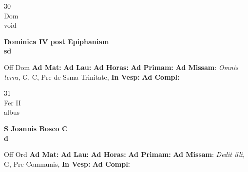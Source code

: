\documentclass[10pt, openany]{book}
\begin{document}
    \begin{center}
        \begin{minipage}{3.5in}
            \vspace{2em}
            \begin{minipage}{0.5in}
                {\Huge 30} \\
                {\normalsize Dom} \\
                {\normalsize void}
            \end{minipage}
            \begin{minipage}{3.0in}
                \textbf{ \large Dominica IV post Epiphaniam \\
                \textnormal{\normalsize sd}} \\ 
            \end{minipage}
            \begin{justify}Off Dom
                \textbf{Ad Mat: }
                \textbf{Ad Lau: }
                \textbf{Ad Horas: }
                \textbf{Ad Primam: }\textbf{Ad Missam}: \textit{Omnis terra,} G, C, Pre de Ssma Trinitate,  
                \textbf{In Vesp: }
                \textbf{Ad Compl: }
            \end{justify}
        \end{minipage}
    \end{center}

    \begin{center}
        \begin{minipage}{3.5in}
            \vspace{2em}
            \begin{minipage}{0.5in}
                {\Huge 31} \\
                {\normalsize Fer II} \\
                {\normalsize albus}
            \end{minipage}
            \begin{minipage}{3.0in}
                \textbf{ \large S Joannis Bosco C \\
                \textnormal{\normalsize d}} \\ 
            \end{minipage}
            \begin{justify}Off Ord
                \textbf{Ad Mat: }
                \textbf{Ad Lau: }
                \textbf{Ad Horas: }
                \textbf{Ad Primam: }\textbf{Ad Missam}: \textit{Dedit illi,} G, Pre Communis,  
                \textbf{In Vesp: }
                \textbf{Ad Compl: }
            \end{justify}
        \end{minipage}
    \end{center}
\end{document}

